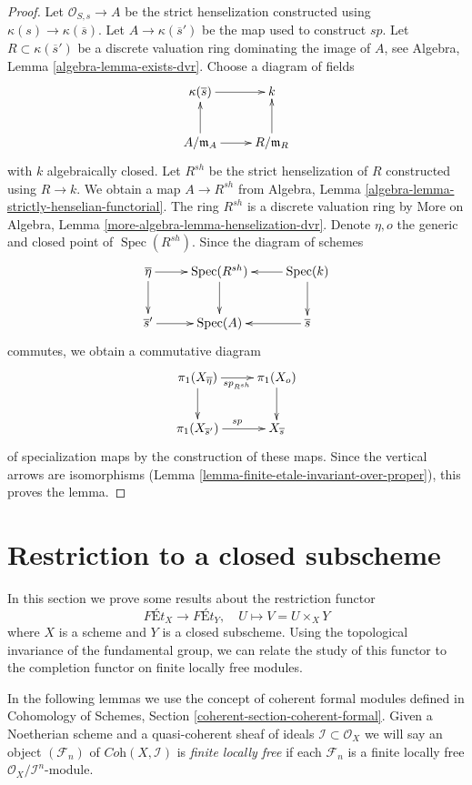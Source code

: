 \documentclass{stacks-project}
\theoremstyle{plain}
\theoremstyle{definition}
\theoremstyle{remark}
\numberwithin{equation}{subsection}
\def\Spec{\mathop{\mathrm{Spec}}}
\begin{document}
\begin{proof}
Let $\mathcal{O}_{S, s} \to A$ be the strict henselization
constructed using $\kappa(s) \to \kappa(\overline{s})$.
Let $A \to \kappa(\overline{s}')$ be the map used to construct $sp$.
Let $R \subset \kappa(\overline{s}')$ be a discrete valuation ring
dominating the image of $A$, see Algebra, Lemma \ref{algebra-lemma-exists-dvr}.
Choose a diagram of fields
$$
\xymatrix{
\kappa(\overline{s}) \ar[r] & k \\
A/\mathfrak m_A \ar[r] \ar[u] & R/\mathfrak m_R \ar[u]
}
$$
with $k$ algebraically closed. Let $R^{sh}$ be the strict
henselization of $R$ constructed using $R \to k$. We obtain
a map $A \to R^{sh}$ from Algebra, Lemma
\ref{algebra-lemma-strictly-henselian-functorial}.
The ring $R^{sh}$ is a discrete valuation ring by
More on Algebra, Lemma \ref{more-algebra-lemma-henselization-dvr}.
Denote $\eta, o$ the generic and closed point of $\Spec(R^{sh})$.
Since the diagram of schemes
$$
\xymatrix{
\overline{\eta} \ar[d] \ar[r] & \Spec(R^{sh}) \ar[d] &
\Spec(k) \ar[d] \ar[l] \\
\overline{s}' \ar[r] & \Spec(A) & \overline{s} \ar[l]
}
$$
commutes, we obtain a commutative diagram
$$
\xymatrix{
\pi_1(X_{\overline{\eta}}) \ar[d] \ar[r]_{sp_{R^{sh}}} & \pi_1(X_o) \ar[d] \\
\pi_1(X_{\overline{s}'}) \ar[r]^{sp} & X_{\overline{s}}
}
$$
of specialization maps by the construction of these maps.
Since the vertical arrows are isomorphisms
(Lemma \ref{lemma-finite-etale-invariant-over-proper}), this proves the lemma.
\end{proof}








\section{Restriction to a closed subscheme}
\label{section-lefschetz}

\noindent
In this section we prove some results about the restriction functor
$$
\textit{F\'Et}_X \longrightarrow \textit{F\'Et}_Y,\quad
U \longmapsto V = U \times_X Y
$$
where $X$ is a scheme and $Y$ is a closed subscheme. Using the
topological invariance of the fundamental group, we can relate
the study of this functor to the completion functor on
finite locally free modules.

\medskip\noindent
In the following lemmas we use the concept of coherent formal modules
defined in
Cohomology of Schemes, Section \ref{coherent-section-coherent-formal}.
Given a Noetherian scheme and a quasi-coherent sheaf of ideals
$\mathcal{I} \subset \mathcal{O}_X$ we will say
an object $(\mathcal{F}_n)$ of $\textit{Coh}(X, \mathcal{I})$
is {\it finite locally free} if each $\mathcal{F}_n$ is a finite
locally free $\mathcal{O}_X/\mathcal{I}^n$-module.
\end{document}
